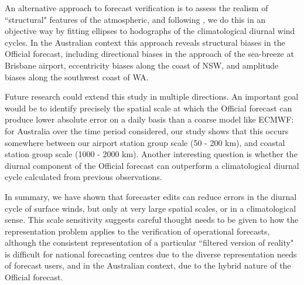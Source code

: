 \documentclass{ametsoc}
\begin{document}
An alternative approach to forecast verification is to assess the realism of ``structural" features of the atmospheric, and following \citet{gille05}, we do this in an objective way by fitting ellipses to hodographs of the climatological diurnal wind cycles. In the Australian context this approach reveals structural biases in the Official forecast, including directional biases in the approach of the sea-breeze at Brisbane airport, eccentricity biases along the coast of NSW, and amplitude biases along the southwest coast of WA.  

Future research could extend this study in multiple directions. An important goal would be to identify precisely the spatial scale at which the Official forecast can produce lower absolute error on a daily basis than a coarse model like ECMWF: for Australia over the time period considered, our study shows that this occurs somewhere between our airport station group scale (50 - 200 km), and coastal station group scale (1000 - 2000 km). Another interesting question is whether the diurnal component of the Official forecast can outperform a climatological diurnal cycle calculated from previous observations. 

In summary, we have shown that forecaster edits can reduce errors in the diurnal cycle of surface winds, but only at very large spatial scales, or in a climatological sense. This scale sensitivity suggests careful thought needs to be given to how the representation problem applies to the verification of operational forecasts, although the consistent representation of a particular ``filtered version of reality" is difficult for national forecasting centres due to the diverse representation needs of forecast users, and in the Australian context, due to the hybrid nature of the Official forecast.



\end{document}
